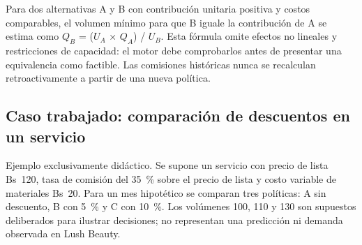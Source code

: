 Para dos alternativas A y B con contribución unitaria positiva y costos comparables, el volumen mínimo para que B iguale la contribución de A se estima como $Q_B$ = ($U_A$ × $Q_A$) / $U_B$. Esta fórmula omite efectos no lineales y restricciones de capacidad: el motor debe comprobarlos antes de presentar una equivalencia como factible. Las comisiones históricas nunca se recalculan retroactivamente a partir de una nueva política.


\subsection{Caso trabajado: comparación de descuentos en un servicio}

Ejemplo exclusivamente didáctico. Se supone un servicio con precio de lista Bs~120, tasa de comisión del 35~\% sobre el precio de lista y costo variable de materiales Bs~20. Para un mes hipotético se comparan tres políticas: A sin descuento, B con 5~\% y C con 10~\%. Los volúmenes 100, 110 y 130 son supuestos deliberados para ilustrar decisiones; no representan una predicción ni demanda observada en Lush Beauty.



